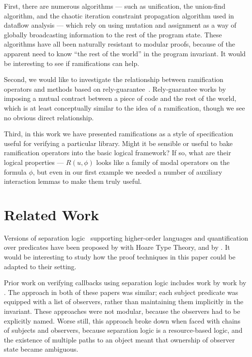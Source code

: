 \documentclass[preprint,natbib]{sigplanconf}
\begin{document}
First, there are numerous algorithms --- such as unification, the
union-find algorithm, and the chaotic iteration constraint propagation
algorithm used in dataflow analysis --- which rely on using mutation
and assignment as a way of globally broadcasting information to the
rest of the program state. These algorithms have all been naturally
resistant to modular proofs, because of the apparent need to know
``the rest of the world'' in the program invariant. It would be
interesting to see if ramifications can help.

Second, we would like to investigate the relationship between
ramification operators and methods based on
rely-guarantee~\cite{rely-guarantee-jones}. Rely-guarantee works by
imposing a mutual contract between a piece of code and the rest of the
world, which is at least conceptually similar to the idea of a
ramification, though we see no obvious direct relationship.

Third, in this work we have presented ramifications as a style of
specification useful for verifying a particular library. Might it be
sensible or useful to bake ramification operators into the basic
logical framework? If so, what are their logical properties --- $R(u,
\phi)$ looks like a family of modal operators on the formula $\phi$, but
even in our first example we needed a number of auxiliary interaction
lemmas to make them truly useful.

\section{Related Work}

Versions of separation logic~\cite{sep-logic} supporting higher-order
languages and quantification over predicates have been proposed by
\citet{htt} with Hoare Type Theory, and by
\citet{parkinson-bierman}. It would be interesting to study how the
proof techniques in this paper could be adapted to their setting.

Prior work on verifying callbacks using separation logic includes work
by \citet{tldi09,ftfjp07} work by
\citet{parkinson-iwaco-07}. The approach in both of these
papers was similar; each subject predicate was equipped with a list of
observers, rather than maintaining them implicitly in the
invariant. These approaches were not modular, because the observers
had to be explicitly named. Worse still, this approach broke down when
faced with chains of subjects and observers, because separation logic
is a resource-based logic, and the existence of multiple paths to an
object meant that ownership of observer state became ambiguous.
\end{document}
